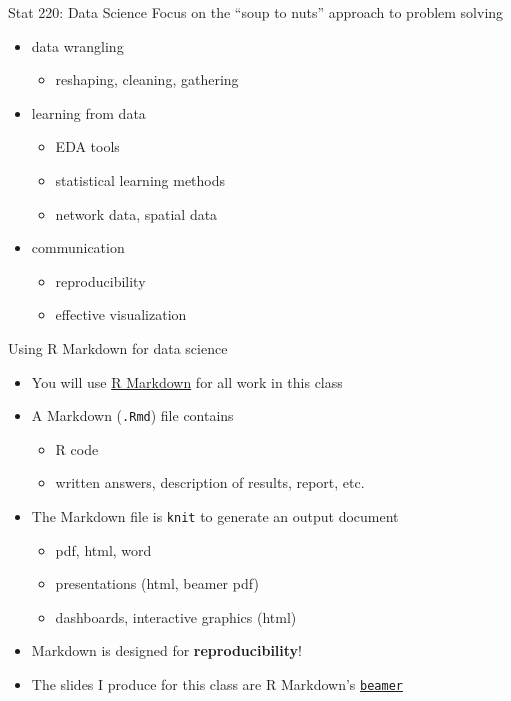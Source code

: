 \documentclass[
  10pt,
  ignorenonframetext,
]{beamer}
\providecommand{\tightlist}{%
  \setlength{\itemsep}{0pt}\setlength{\parskip}{0pt}}
\begin{document}
\begin{frame}{Stat 220: Data Science}
\protect\hypertarget{stat-220-data-science}{}
Focus on the ``soup to nuts'' approach to problem solving

\begin{itemize}
\tightlist
\item
  data wrangling

  \begin{itemize}
  \tightlist
  \item
    reshaping, cleaning, gathering
  \end{itemize}
\item
  learning from data

  \begin{itemize}
  \tightlist
  \item
    EDA tools
  \item
    statistical learning methods
  \item
    network data, spatial data
  \end{itemize}
\item
  communication

  \begin{itemize}
  \tightlist
  \item
    reproducibility
  \item
    effective visualization
  \end{itemize}
\end{itemize}
\end{frame}

\begin{frame}[fragile]{Using R Markdown for data science}
\protect\hypertarget{using-r-markdown-for-data-science}{}
\begin{itemize}
\tightlist
\item
  You will use \href{http://rmarkdown.rstudio.com/lesson-1.html}{R
  Markdown} for all work in this class
\item
  A Markdown (\texttt{.Rmd}) file contains

  \begin{itemize}
  \tightlist
  \item
    R code
  \item
    written answers, description of results, report, etc.
  \end{itemize}
\item
  The Markdown file is \texttt{knit} to generate an output document

  \begin{itemize}
  \tightlist
  \item
    pdf, html, word
  \item
    presentations (html, beamer pdf)
  \item
    dashboards, interactive graphics (html)
  \end{itemize}
\item
  Markdown is designed for \textbf{reproducibility}!
\item
  The slides I produce for this class are R Markdown's
  \href{http://rmarkdown.rstudio.com/beamer_presentation_format.html}{\texttt{beamer}}
\end{itemize}
\end{frame}
\end{document}
